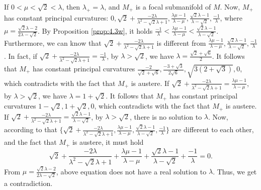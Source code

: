 \documentclass[reqno]{amsart}%
\theoremstyle{definition}
\numberwithin{equation}{section}
\begin{document}
If $0<\mu<\sqrt{2}<\lambda$, then $\lambda_+=\lambda$, and $M_+$ is a focal submanifold of $M$.
Now, $M_+$ has constant principal curvatures:
$0,\sqrt{2}+\frac{-2\lambda}{\lambda^2-\sqrt{2}\lambda+1},\frac{\lambda\mu-1}{\lambda-\mu},
\frac{\sqrt{2}\lambda-1}{\lambda-\sqrt{2}},\frac{-1}{\lambda}$, where $\mu=\frac{\sqrt{2}\lambda-2}{2\lambda-\sqrt{2}}$.
By Proposition \ref{prop:4.3w}, it holds  $\frac{-1}{\lambda}<\frac{\lambda\mu-1}{\lambda-\mu}<\frac{\sqrt{2}\lambda-1}{\lambda-\sqrt{2}}$.
Furthermore, we can know that $\sqrt{2}+\frac{-2\lambda}{\lambda^2-\sqrt{2}\lambda+1}$ is different from $\frac{\lambda\mu-1}{\lambda-\mu},
\frac{\sqrt{2}\lambda-1}{\lambda-\sqrt{2}},\frac{-1}{\lambda}$. In
fact, if $\sqrt{2}+\frac{-2\lambda}{\lambda^2-\sqrt{2}\lambda+1}=\frac{-1}{\lambda}$, by $\lambda>\sqrt{2}$, we have $\lambda=\frac{\sqrt{2}+\sqrt{6}}{2}$. It follows that $M_+$
has constant principal curvatures $\frac{-2}{\sqrt{2}+\sqrt{6}},\frac{-3+\sqrt{3}}{2\sqrt{6}},
\sqrt{3(2+\sqrt{3})},0$, which contradicts with the fact that $M_+$ is austere.
If $\sqrt{2}+\frac{-2\lambda}{\lambda^2-\sqrt{2}\lambda+1}=\frac{\lambda\mu-1}{\lambda-\mu}$, by $\lambda>\sqrt{2}$, we have $\lambda=1+\sqrt{2}$. It follows that $M_+$
has constant principal curvatures $1-\sqrt{2},1+\sqrt{2},0$, which contradicts with the fact that $M_+$ is austere. If $\sqrt{2}+\frac{-2\lambda}{\lambda^2-\sqrt{2}\lambda+1}=\frac{\sqrt{2}\lambda-1}{\lambda-\sqrt{2}}$, by $\lambda>\sqrt{2}$, there is no solution to $\lambda$.
Now, according to that $\{\sqrt{2}+\frac{-2\lambda}{\lambda^2-\sqrt{2}\lambda+1},\frac{\lambda\mu-1}{\lambda-\mu},
\frac{\sqrt{2}\lambda-1}{\lambda-\sqrt{2}},\frac{-1}{\lambda}\}$ are different to each other, and the fact that $M_+$ is austere, it must hold
$$
\sqrt{2}+\frac{-2\lambda}{\lambda^2-\sqrt{2}\lambda+1}+\frac{\lambda\mu-1}{\lambda-\mu}+
\frac{\sqrt{2}\lambda-1}{\lambda-\sqrt{2}}+\frac{-1}{\lambda}=0.
$$
From $\mu=\frac{\sqrt{2}\lambda-2}{2\lambda-\sqrt{2}}$, above equation does not have a real solution to $\lambda$. Thus, we get a contradiction.
\end{document}
